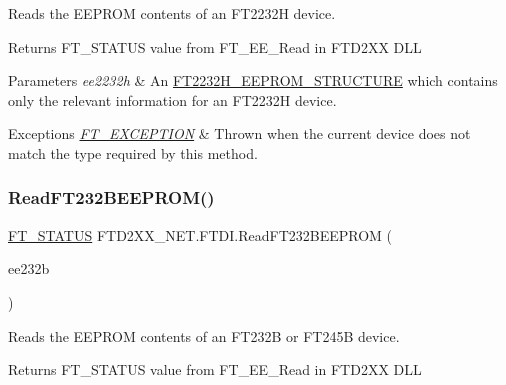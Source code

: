 Reads the E\+E\+P\+R\+OM contents of an F\+T2232H device. 

\begin{DoxyReturn}{Returns}
F\+T\+\_\+\+S\+T\+A\+T\+US value from F\+T\+\_\+\+E\+E\+\_\+\+Read in F\+T\+D2\+XX D\+LL
\end{DoxyReturn}

\begin{DoxyParams}{Parameters}
{\em ee2232h} & An \mbox{\hyperlink{class_f_t_d2_x_x___n_e_t_1_1_f_t_d_i_1_1_f_t2232_h___e_e_p_r_o_m___s_t_r_u_c_t_u_r_e}{F\+T2232\+H\+\_\+\+E\+E\+P\+R\+O\+M\+\_\+\+S\+T\+R\+U\+C\+T\+U\+RE}} which contains only the relevant information for an F\+T2232H device.\\
\hline
\end{DoxyParams}

\begin{DoxyExceptions}{Exceptions}
{\em \mbox{\hyperlink{class_f_t_d2_x_x___n_e_t_1_1_f_t_d_i_1_1_f_t___e_x_c_e_p_t_i_o_n}{F\+T\+\_\+\+E\+X\+C\+E\+P\+T\+I\+ON}}} & Thrown when the current device does not match the type required by this method.\\
\hline
\end{DoxyExceptions}
\mbox{\label{class_f_t_d2_x_x___n_e_t_1_1_f_t_d_i_a8e5ae627da7cb311dd416adaf981465f}} 
\subsubsection{\texorpdfstring{ReadFT232BEEPROM()}{ReadFT232BEEPROM()}}
{\footnotesize\ttfamily \mbox{\hyperlink{class_f_t_d2_x_x___n_e_t_1_1_f_t_d_i_aabe20ad905cc4ccc1e35dd5b877d9a83}{F\+T\+\_\+\+S\+T\+A\+T\+US}} F\+T\+D2\+X\+X\+\_\+\+N\+E\+T.\+F\+T\+D\+I.\+Read\+F\+T232\+B\+E\+E\+P\+R\+OM (\begin{DoxyParamCaption}\item[{\mbox{\hyperlink{class_f_t_d2_x_x___n_e_t_1_1_f_t_d_i_1_1_f_t232_b___e_e_p_r_o_m___s_t_r_u_c_t_u_r_e}{F\+T232\+B\+\_\+\+E\+E\+P\+R\+O\+M\+\_\+\+S\+T\+R\+U\+C\+T\+U\+RE}}}]{ee232b }\end{DoxyParamCaption})}



Reads the E\+E\+P\+R\+OM contents of an F\+T232B or F\+T245B device. 

\begin{DoxyReturn}{Returns}
F\+T\+\_\+\+S\+T\+A\+T\+US value from F\+T\+\_\+\+E\+E\+\_\+\+Read in F\+T\+D2\+XX D\+LL
\end{DoxyReturn}

